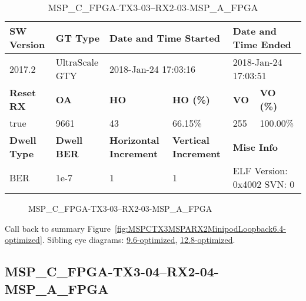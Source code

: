 \begin{table}[h]
\centering
\caption{MSP\_C\_FPGA-TX3-03--RX2-03-MSP\_A\_FPGA}
\label{tab:MSPCFPGATX303RX203MSPAFPGA6.4-optimized}
\begin{tabular}{@{}|l|l|l|l|l|l|@{}}
\toprule
\textbf{SW Version}                & \textbf{GT Type}   & \multicolumn{2}{l|}{\textbf{Date and Time Started}}            & \multicolumn{2}{l|}{\textbf{Date and Time Ended}}        \\ \midrule
2017.2                       & UltraScale GTY          & \multicolumn{2}{l|}{2018-Jan-24 17:03:16}                   & \multicolumn{2}{l|}{2018-Jan-24 17:03:51}               \\ \midrule
\textbf{Reset RX}                  & \textbf{OA} & \textbf{HO}   & \textbf{HO (\%)} & \textbf{VO} & \textbf{VO (\%)} \\ \midrule
true & 9661        & 43          & 66.15\%        & 255        & 100.00\%       \\ \midrule
\textbf{Dwell Type}                & \textbf{Dwell BER} & \textbf{Horizontal Increment} & \textbf{Vertical Increment}    & \multicolumn{2}{l|}{\textbf{Misc Info}}                  \\ \midrule
BER                            & 1e-7        & 1        & 1           & \multicolumn{2}{l|}{ELF Version: 0x4002 SVN: 0}                         \\ \bottomrule
\end{tabular}
\end{table}

\begin{figure}[h]
\caption{MSP\_C\_FPGA-TX3-03--RX2-03-MSP\_A\_FPGA} \label{fig:MSPCFPGATX303RX203MSPAFPGA6.4-optimized}
\end{figure}

Call back to summary Figure~\ref{fig:MSPCTX3MSPARX2MinipodLoopback6.4-optimized}.
Sibling eye diagrams: \hyperref[sec:MSPCFPGATX303RX203MSPAFPGA9.6-optimized]{9.6-optimized}, \hyperref[sec:MSPCFPGATX303RX203MSPAFPGA12.8-optimized]{12.8-optimized}.

\clearpage
\newpage


\subsection{MSP\_C\_FPGA-TX3-04--RX2-04-MSP\_A\_FPGA}\label{sec:MSPCFPGATX304RX204MSPAFPGA6.4-optimized}

